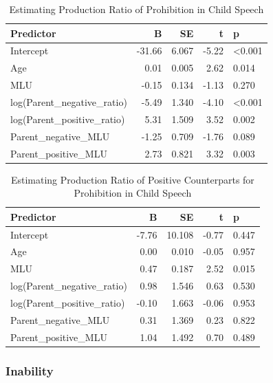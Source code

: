 \documentclass[
  english,
  man,floatsintext]{apa6}
\begin{document}
\begin{table}

\caption{\label{tab:unnamed-chunk-4}Estimating Production Ratio of Prohibition in Child Speech}
\centering
\begin{tabular}[t]{l|r|r|r|l}
\hline
Predictor & B & SE & t & p\\
\hline
Intercept & -31.66 & 6.067 & -5.22 & <0.001\\
\hline
Age & 0.01 & 0.005 & 2.62 & 0.014\\
\hline
MLU & -0.15 & 0.134 & -1.13 & 0.270\\
\hline
log(Parent\_negative\_ratio) & -5.49 & 1.340 & -4.10 & <0.001\\
\hline
log(Parent\_positive\_ratio) & 5.31 & 1.509 & 3.52 & 0.002\\
\hline
Parent\_negative\_MLU & -1.25 & 0.709 & -1.76 & 0.089\\
\hline
Parent\_positive\_MLU & 2.73 & 0.821 & 3.32 & 0.003\\
\hline
\end{tabular}
\end{table}

\begin{table}

\caption{\label{tab:unnamed-chunk-4}Estimating Production Ratio of Positive Counterparts for Prohibition in Child Speech}
\centering
\begin{tabular}[t]{l|r|r|r|l}
\hline
Predictor & B & SE & t & p\\
\hline
Intercept & -7.76 & 10.108 & -0.77 & 0.447\\
\hline
Age & 0.00 & 0.010 & -0.05 & 0.957\\
\hline
MLU & 0.47 & 0.187 & 2.52 & 0.015\\
\hline
log(Parent\_negative\_ratio) & 0.98 & 1.546 & 0.63 & 0.530\\
\hline
log(Parent\_positive\_ratio) & -0.10 & 1.663 & -0.06 & 0.953\\
\hline
Parent\_negative\_MLU & 0.31 & 1.369 & 0.23 & 0.822\\
\hline
Parent\_positive\_MLU & 1.04 & 1.492 & 0.70 & 0.489\\
\hline
\end{tabular}
\end{table}

\clearpage

\hypertarget{inability}{%
\subsubsection{Inability}\label{inability}}
\end{document}
